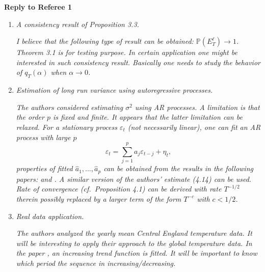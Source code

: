 \documentclass[a4paper,12pt]{article}
\begin{document}
 

\newpage
\begin{center}
{\large \bf Reply to Referee 1} 
\end{center}



\begin{enumerate}[label=(\arabic*),leftmargin=0.8cm]

\item \textit{A consistency result of Proposition 3.3.}

\textit{I believe that the following type of result can be obtained: $\mathbb{P} (E^{\ell}_T) \to 1$. Theorem 3.1 is for testing purpose. In certain application one might be interested in such consistency result. Basically one needs to study the behavior of $q_T(\alpha)$ when $\alpha \to 0$.}


\item \textit{Estimation of long run variance using autoregressive processes.}

\textit{The authors considered estimating $\sigma^2$ using AR processes. A limitation is that the order $p$ is fixed and finite. It appears that the latter limitation can be relaxed. For a stationary process $\varepsilon_t$ (not necessarily linear), one can fit an AR process with large $p$}
\[ \varepsilon_t = \sum_{j=1}^p a_j \varepsilon_{t-j} + \eta_t, \]
\textit{properties of fitted $\widehat{a}_1, \ldots, \widehat{a}_p$ can be obtained from the results in the following papers: \cite{WuPourahmadi2009} and \cite{XiaoWu2012}.
A similar version of the authors' estimate (4.14) can be used. Rate of convergence (cf.\ Proposition 4.1) can be derived with rate $T^{-1/2}$ therein possibly replaced by a larger term of the form $T^{-c}$ with $c < 1/2$.}


\item \textit{Real data application.}

\textit{The authors analyzed the yearly mean Central England temperature data. It will be interesting to apply their approach to the global temperature data. In the paper \cite{WuWoodroofeMentz2001}, an increasing trend function is fitted. It will be important to know which period the sequence in increasing/decreasing.}



\end{enumerate}
\end{document}
